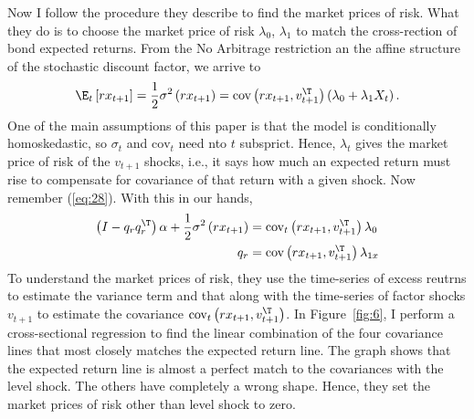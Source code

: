 Now I follow the procedure they describe to find the market prices of risk. What they do is to choose the market price of risk $\lambda_0$, $\lambda_1$ to match the cross-rection of bond expected returns. From the No Arbitrage restriction an the affine structure of the stochastic discount factor, we arrive to
\begin{equation}
	\E_t\left[rx_{t+1}\right] = \frac{1}{2}\sigma^2\left(rx_{t+1}\right) = \text{cov}\left(rx_{t+1}, v_{t+1}^\T\right) \left(\lambda_0 + \lambda_1 X_t\right).
\end{equation}
One of the main assumptions of this paper is that the model is conditionally homoskedastic, so $\sigma_t$ and $\text{cov}_t$ need nto $t$ subsprict. Hence, $\lambda_t$ gives the market price of risk of the $v_{t+1}$ shocks, i.e., it says how much an expected return must rise to compensate for covariance of that return with a given shock. Now remember (\ref{eq:28}). With this in our hands,
\begin{align}
		\left(I-q_rq_r^\T\right)\alpha + \frac{1}{2}\sigma^2\left(rx_{t+1}\right) &= \text{cov}_t\left(rx_{t+1}, v_{t+1}^\T\right) \lambda_0\\
		q_r &= \text{cov}\left(rx_{t+1}, v_{t+1}^\T\right)\lambda_{1x}
\end{align}
To understand the market prices of risk, they use the time-series of excess reutrns to estimate the variance term and that along with the time-series of factor shocks $v_{t+1}$ to estimate the covariance $\text{cov}_t\left(rx_{t+1}, v_{t+1}^\T\right)$. In Figure~\ref{fig:6}, I perform a cross-sectional regression to find the linear combination of the four covariance lines that most closely matches the expected return line. The graph shows that the expected return line is almost a perfect match to the covariances with the level shock. The others have completely a wrong shape. Hence, they set the market prices of risk other than level shock to zero.
